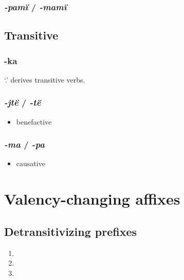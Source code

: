 \documentclass{memoir}
\begin{document}
\subsubsection{\texorpdfstring{\emph{-pamï} /
\emph{-mamï}}{-pamï / -mamï}}


\subsection{Transitive}

\subsubsection{-ka}

 `.' derives transitive verbs.

\subsubsection{\texorpdfstring{\emph{-jtë} / \emph{-të}}{-jtë / -të}}

\begin{itemize}
\tightlist
\item
  benefactive
\end{itemize}

\subsubsection{\texorpdfstring{\emph{-ma} / \emph{-pa}}{-ma / -pa}}

\begin{itemize}
\tightlist
\item
  causative
\end{itemize}

\section{Valency-changing affixes}

\subsection{\texorpdfstring{Detransitivizing prefixes
\label{sec:detrz}}{Detransitivizing prefixes }}


\begin{enumerate}
\def\labelenumi{\arabic{enumi}.}
\item
\item
\item
\end{enumerate}
\end{document}
